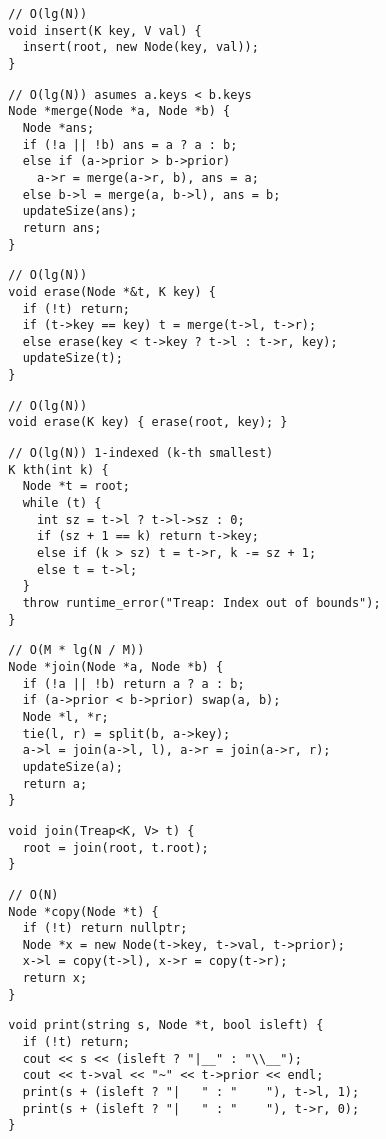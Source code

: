 \documentclass[twoside]{article}
\begin{document}
\begin{multicols*}{2}
\begin{verbatim}
  // O(lg(N))
  void insert(K key, V val) {
    insert(root, new Node(key, val));
  }
\end{verbatim}
\vspace{-12pt}
\begin{verbatim}
  // O(lg(N)) asumes a.keys < b.keys
  Node *merge(Node *a, Node *b) {
    Node *ans;
    if (!a || !b) ans = a ? a : b;
    else if (a->prior > b->prior)
      a->r = merge(a->r, b), ans = a;
    else b->l = merge(a, b->l), ans = b;
    updateSize(ans);
    return ans;
  }
\end{verbatim}
\vspace{-12pt}
\begin{verbatim}
  // O(lg(N))
  void erase(Node *&t, K key) {
    if (!t) return;
    if (t->key == key) t = merge(t->l, t->r);
    else erase(key < t->key ? t->l : t->r, key);
    updateSize(t);
  }
\end{verbatim}
\vspace{-12pt}
\begin{verbatim}
  // O(lg(N))
  void erase(K key) { erase(root, key); }
\end{verbatim}
\vspace{-12pt}
\begin{verbatim}
  // O(lg(N)) 1-indexed (k-th smallest)
  K kth(int k) {
    Node *t = root;
    while (t) {
      int sz = t->l ? t->l->sz : 0;
      if (sz + 1 == k) return t->key;
      else if (k > sz) t = t->r, k -= sz + 1;
      else t = t->l;
    }
    throw runtime_error("Treap: Index out of bounds");
  }
\end{verbatim}
\vspace{-12pt}
\begin{verbatim}
  // O(M * lg(N / M))
  Node *join(Node *a, Node *b) {
    if (!a || !b) return a ? a : b;
    if (a->prior < b->prior) swap(a, b);
    Node *l, *r;
    tie(l, r) = split(b, a->key);
    a->l = join(a->l, l), a->r = join(a->r, r);
    updateSize(a);
    return a;
  }
\end{verbatim}
\vspace{-12pt}
\begin{verbatim}
  void join(Treap<K, V> t) {
    root = join(root, t.root);
  }
\end{verbatim}
\vspace{-12pt}
\begin{verbatim}
  // O(N)
  Node *copy(Node *t) {
    if (!t) return nullptr;
    Node *x = new Node(t->key, t->val, t->prior);
    x->l = copy(t->l), x->r = copy(t->r);
    return x;
  }
\end{verbatim}
\vspace{-12pt}
\begin{verbatim}
  void print(string s, Node *t, bool isleft) {
    if (!t) return;
    cout << s << (isleft ? "|__" : "\\__");
    cout << t->val << "~" << t->prior << endl;
    print(s + (isleft ? "|   " : "    "), t->l, 1);
    print(s + (isleft ? "|   " : "    "), t->r, 0);
  }


\end{verbatim}
\end{multicols*}
\end{document}
